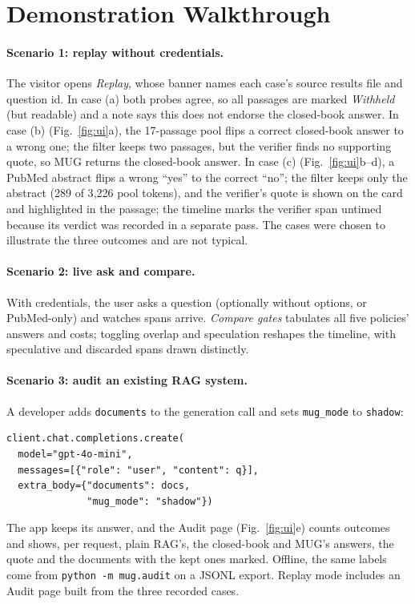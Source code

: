 \documentclass[11pt]{article}
\begin{document}
\section{Demonstration Walkthrough}
\label{sec:demo}
\paragraph{Scenario 1: replay without credentials.} The visitor opens
\emph{Replay}, whose banner names each case's source results file and question
id. In case (a) both probes agree, so all passages are marked \emph{Withheld} (but
readable) and a note says this does not endorse the closed-book answer. In case
(b) (Fig.~\ref{fig:ui}a), the
17-passage pool flips a correct closed-book answer to a wrong one; the filter
keeps two passages, but the verifier finds no supporting quote, so MUG returns
the closed-book answer. In case (c) (Fig.~\ref{fig:ui}b--d), a PubMed abstract
flips a wrong ``yes'' to the correct ``no''; the filter keeps only the abstract
(289 of 3{,}226 pool tokens), and the verifier's quote is shown on the card and
highlighted in the passage; the timeline marks the verifier span untimed
because its verdict was recorded in a separate pass. The cases were chosen to
illustrate the three outcomes and are not typical.

\paragraph{Scenario 2: live ask and compare.} With credentials, the user asks a
question (optionally without options, or PubMed-only) and watches spans arrive.
\emph{Compare gates} tabulates all five policies' answers and costs; toggling
overlap and speculation reshapes the timeline, with speculative and discarded
spans drawn distinctly.

\paragraph{Scenario 3: audit an existing RAG system.} A developer adds
\texttt{documents} to the generation call and sets \texttt{mug\_mode} to
\texttt{shadow}:
{\footnotesize
\begin{verbatim}
client.chat.completions.create(
  model="gpt-4o-mini",
  messages=[{"role": "user", "content": q}],
  extra_body={"documents": docs,
              "mug_mode": "shadow"})
\end{verbatim}}
\noindent The app keeps its answer, and the Audit page (Fig.~\ref{fig:ui}e)
counts outcomes and shows, per request, plain RAG's, the closed-book and MUG's
answers, the quote and the documents with the kept ones marked. Offline, the
same labels come from \texttt{python -m mug.audit} on a JSONL export. Replay
mode includes an Audit page built from the three recorded cases.
\end{document}
